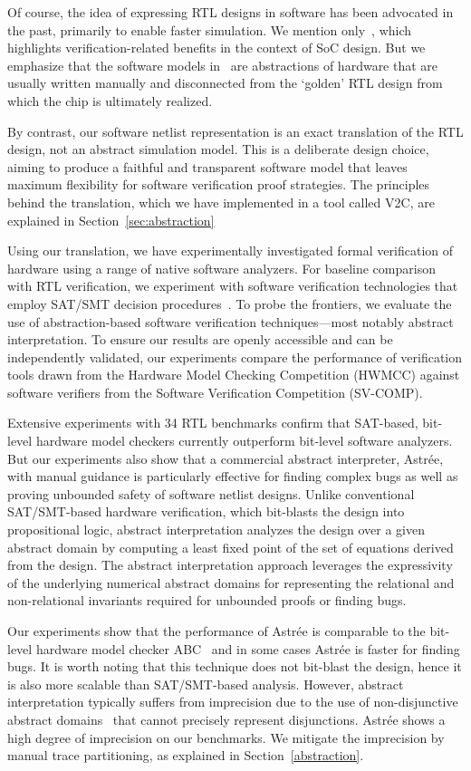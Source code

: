 Of course, the idea of expressing RTL designs in software has been  advocated in the past, primarily to enable faster simulation. We mention only~\cite{soc-keating}, which highlights verification-related benefits in the context of SoC design.  But we emphasize that the software models in~\cite{soc-keating} are abstractions of hardware that are usually written manually and disconnected from the `golden' RTL design  from which the chip is ultimately realized.  

By contrast, our software netlist representation is an exact translation of the RTL design, not an abstract simulation model.  This is a deliberate design choice, aiming to produce a faithful and transparent software model that leaves maximum flexibility for software verification proof strategies. The principles behind the translation, which we have implemented in a tool called \textsc{V2C}, are explained in Section~\ref{sec:abstraction}

Using our translation, we have experimentally investigated formal verification of hardware using a range of 
native software analyzers.  For baseline comparison with RTL verification, we experiment with software verification technologies that employ SAT/SMT decision procedures~\cite{DBLP:conf/cav/BeyerK11,2ls,cbmc.tacas:2004,DBLP:conf/tacas/HeizmannDGLMSP16}. To 
probe the frontiers, we evaluate the use of abstraction-based software verification 
techniques---most notably abstract interpretation. To ensure our results are openly accessible and can be independently validated, our experiments compare the performance of verification tools drawn from  the Hardware Model Checking Competition (HWMCC) against software verifiers from the Software Verification Competition (SV-COMP).

Extensive experiments with 34 RTL benchmarks confirm that SAT-based, bit-level hardware model checkers currently outperform bit-level software analyzers.  But our experiments also show that a commercial abstract interpreter, Astr{\'e}e, with manual guidance is particularly effective for finding complex bugs as well as proving unbounded safety of software netlist designs. Unlike conventional SAT/SMT-based hardware verification, which bit-blasts the design into propositional logic,   abstract interpretation analyzes the design over a given abstract domain by computing a least fixed point of the set of equations derived from the design.  The abstract interpretation approach leverages the expressivity of the underlying numerical abstract domains for representing the relational and non-relational invariants required for unbounded proofs or finding bugs.  

Our experiments show that the performance of Astr{\'e}e is comparable to the bit-level hardware model checker ABC~\cite{abc} and in some cases Astr{\'e}e is faster for finding bugs.  It is worth noting that this technique does not bit-blast the design, hence it is also more scalable than SAT/SMT-based analysis.  However, abstract interpretation typically suffers from imprecision due to the use of non-disjunctive abstract domains~\cite{nd} that cannot precisely represent disjunctions.  Astr{\'e}e shows a high degree of imprecision on our benchmarks. We mitigate the imprecision by manual trace partitioning, as explained in Section~\ref{abstraction}.  
